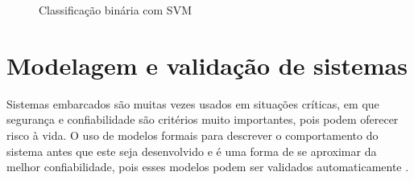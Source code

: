 \begin{figure}[ht]
    \centering
    \caption{Classificação binária com SVM}
    \label{fig:svm_classification}
        \hspace{0.2cm}
\end{figure}


\section{Modelagem e validação de sistemas}
\label{sec:modelosformais}
Sistemas embarcados são muitas vezes usados em situações críticas, em que segurança e confiabilidade são critérios muito importantes, pois podem oferecer risco à vida. O uso de modelos formais para descrever o comportamento do sistema antes que este seja desenvolvido e é uma forma de se aproximar da melhor confiabilidade, pois esses modelos podem ser validados automaticamente \cite{edwards:1997}.

